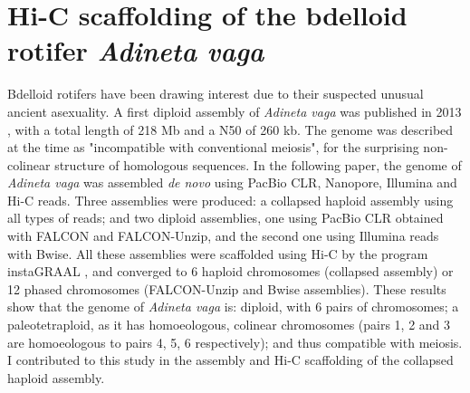 
\chapter{Hi-C scaffolding of the bdelloid rotifer \textit{Adineta vaga}}

Bdelloid rotifers have been drawing interest due to their suspected unusual ancient asexuality. A first diploid assembly of \textit{Adineta vaga} was published in 2013 \cite{flot2013}, with a total length of 218 Mb and a N50 of 260 kb. The genome was described at the time as "incompatible with conventional meiosis", for the surprising non-colinear structure of homologous sequences. In the following paper, the genome of \textit{Adineta vaga} was assembled \textit{de novo} using PacBio CLR, Nanopore, Illumina and Hi-C reads. Three assemblies were produced: a collapsed haploid assembly using all types of reads; and two diploid assemblies, one using PacBio CLR obtained with FALCON and FALCON-Unzip, and the second one using Illumina reads with Bwise. All these assemblies were scaffolded using Hi-C by the program instaGRAAL \cite{instagraal}, and converged to 6 haploid chromosomes (collapsed assembly) or 12 phased chromosomes (FALCON-Unzip and Bwise assemblies). These results show that the genome of \textit{Adineta vaga} is: diploid, with 6 pairs of chromosomes; a paleotetraploid, as it has homoeologous, colinear chromosomes (pairs 1, 2 and 3 are homoeologous to pairs 4, 5, 6 respectively); and thus compatible with meiosis. \\
I contributed to this study in the assembly and Hi-C scaffolding of the collapsed haploid assembly. \\




